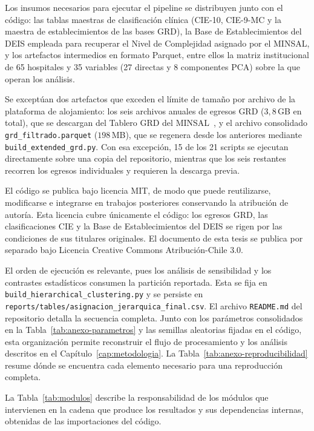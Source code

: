 Los insumos necesarios para ejecutar el pipeline se distribuyen junto con el
código: las tablas maestras de clasificación clínica (CIE-10, CIE-9-MC y la
maestra de establecimientos de las bases GRD), la Base de Establecimientos del
DEIS empleada para recuperar el Nivel de Complejidad asignado por el MINSAL, y
los artefactos intermedios en formato Parquet, entre ellos la matriz
institucional de 65 hospitales y 35 variables (27 directas y 8 componentes
PCA) sobre la que operan los análisis.

Se exceptúan dos artefactos que exceden el límite de tamaño por archivo de la
plataforma de alojamiento: los seis archivos anuales de egresos GRD
($3{,}8$\,GB en total), que se descargan del Tablero GRD del
MINSAL~\citep{TableauGRD}, y el archivo consolidado
\texttt{grd\_filtrado.parquet} ($198$\,MB), que se regenera desde
los anteriores mediante \texttt{build\_extended\_grd.py}. Con esa excepción, 15
de los 21 scripts se ejecutan directamente sobre una copia del repositorio, mientras que los
seis restantes recorren los egresos individuales y requieren la descarga previa.

El código se publica bajo licencia MIT, de modo que puede reutilizarse,
modificarse e integrarse en trabajos posteriores conservando la atribución de
autoría. Esta licencia cubre únicamente el código: los egresos GRD, las
clasificaciones CIE y la Base de Establecimientos del DEIS se rigen por las
condiciones de sus titulares originales. El documento de esta tesis se publica
por separado bajo Licencia Creative Commons Atribución-Chile 3.0.

El orden de ejecución es relevante, pues los análisis de sensibilidad y los
contrastes estadísticos consumen la partición reportada. Esta se fija en
\texttt{build\_hierarchical\_clustering.py} y se persiste en
\texttt{reports/tables/asignacion\_jerarquica\_final.csv}. El archivo
\texttt{README.md} del repositorio detalla la secuencia completa. Junto con los
parámetros consolidados en la Tabla~\ref{tab:anexo-parametros} y las semillas
aleatorias fijadas en el código, esta organización permite reconstruir el flujo
de procesamiento y los análisis descritos en el
Capítulo~\ref{cap:metodologia}. La Tabla~\ref{tab:anexo-reproducibilidad}
resume dónde se encuentra cada elemento necesario para una reproducción
completa.

La Tabla~\ref{tab:modulos} describe la responsabilidad de los módulos que
intervienen en la cadena que produce los resultados y sus dependencias
internas, obtenidas de las importaciones del código.

